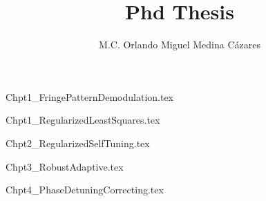 \documentclass[letterpaper,11pt]{book}
\title{Phd Thesis}
\author{M.C. Orlando Miguel Medina C\'azares}
\begin{document}
\maketitle


\clearpage
\thispagestyle{empty}

\tableofcontents
{}
\listoffigures

\mainmatter
{Chpt1_FringePatternDemodulation.tex}

{Chpt1_RegularizedLeastSquares.tex}

{Chpt2_RegularizedSelfTuning.tex}

{Chpt3_RobustAdaptive.tex}

{Chpt4_PhaseDetuningCorrecting.tex}


\medskip

\end{document}
